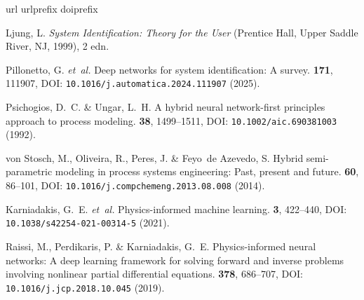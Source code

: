 \documentclass[fleqn,10pt]{wlscirep}
\begin{document}
\begin{thebibliography}{10}
\expandafter\ifx\csname url\endcsname\relax
  \def\url#1{\texttt{#1}}\fi
\expandafter\ifx\csname urlprefix\endcsname\relax\def\urlprefix{URL }\fi
\expandafter\ifx\csname doiprefix\endcsname\relax\def\doiprefix{DOI: }\fi
\providecommand{\bibinfo}[2]{#2}
\providecommand{\eprint}[2][]{\url{#2}}

\bibinfo{author}{Ljung, L.}
\newblock \emph{\bibinfo{title}{System Identification: Theory for the User}}
  (\bibinfo{publisher}{Prentice Hall}, \bibinfo{address}{Upper Saddle River,
  NJ}, \bibinfo{year}{1999}), \bibinfo{edition}{2} edn.

\bibinfo{author}{Pillonetto, G.} \emph{et~al.}
\newblock \bibinfo{journal}{\bibinfo{title}{Deep networks for system
  identification: A survey}}.
 \textbf{\bibinfo{volume}{171}},
  \bibinfo{pages}{111907}, \doiprefix\url{10.1016/j.automatica.2024.111907}
  (\bibinfo{year}{2025}).

\bibinfo{author}{Psichogios, D.~C.} \& \bibinfo{author}{Ungar, L.~H.}
\newblock \bibinfo{journal}{\bibinfo{title}{A hybrid neural network-first
  principles approach to process modeling}}.
 \textbf{\bibinfo{volume}{38}},
  \bibinfo{pages}{1499--1511}, \doiprefix\url{10.1002/aic.690381003}
  (\bibinfo{year}{1992}).

\bibinfo{author}{von Stosch, M.}, \bibinfo{author}{Oliveira, R.},
  \bibinfo{author}{Peres, J.} \& \bibinfo{author}{Feyo~de Azevedo, S.}
\newblock \bibinfo{journal}{\bibinfo{title}{Hybrid semi-parametric modeling in
  process systems engineering: Past, present and future}}.
  \textbf{\bibinfo{volume}{60}}, \bibinfo{pages}{86--101},
  \doiprefix\url{10.1016/j.compchemeng.2013.08.008} (\bibinfo{year}{2014}).

\bibinfo{author}{Karniadakis, G.~E.} \emph{et~al.}
\newblock \bibinfo{journal}{\bibinfo{title}{Physics-informed machine
  learning}}.
  \textbf{\bibinfo{volume}{3}}, \bibinfo{pages}{422--440},
  \doiprefix\url{10.1038/s42254-021-00314-5} (\bibinfo{year}{2021}).

\bibinfo{author}{Raissi, M.}, \bibinfo{author}{Perdikaris, P.} \&
  \bibinfo{author}{Karniadakis, G.~E.}
\newblock \bibinfo{journal}{\bibinfo{title}{Physics-informed neural networks: A
  deep learning framework for solving forward and inverse problems involving
  nonlinear partial differential equations}}.
  \textbf{\bibinfo{volume}{378}}, \bibinfo{pages}{686--707},
  \doiprefix\url{10.1016/j.jcp.2018.10.045} (\bibinfo{year}{2019}).


\end{thebibliography}
\end{document}
